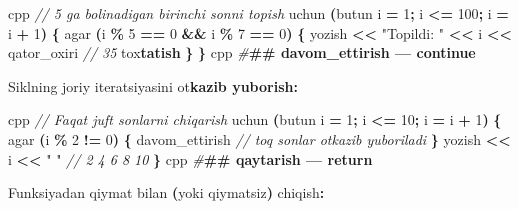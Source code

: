 \documentclass[a4paper,11pt,twoside,openright]{book}
\newenvironment{Shaded}{\begin{snugshade}}{\end{snugshade}}
\newcommand{\CharTok}[1]{\textcolor[rgb]{0.31,0.60,0.02}{#1}}
\newcommand{\CommentTok}[1]{\textcolor[rgb]{0.56,0.35,0.01}{\textit{#1}}}
\newcommand{\DecValTok}[1]{\textcolor[rgb]{0.00,0.00,0.81}{#1}}
\newcommand{\ErrorTok}[1]{\textcolor[rgb]{0.64,0.00,0.00}{\textbf{#1}}}
\newcommand{\NormalTok}[1]{#1}
\newcommand{\OperatorTok}[1]{\textcolor[rgb]{0.81,0.36,0.00}{\textbf{#1}}}
\newcommand{\PreprocessorTok}[1]{\textcolor[rgb]{0.56,0.35,0.01}{\textit{#1}}}
\newcommand{\StringTok}[1]{\textcolor[rgb]{0.31,0.60,0.02}{#1}}
\begin{document}
\begin{Shaded}
\begin{Highlighting}[]
\ErrorTok{\textasciigrave{}\textasciigrave{}\textasciigrave{}}\NormalTok{cpp}
\CommentTok{// 5 ga bo\textquotesingle{}linadigan birinchi sonni topish}
\NormalTok{uchun }\OperatorTok{(}\NormalTok{butun i }\OperatorTok{=} \DecValTok{1}\OperatorTok{;}\NormalTok{ i }\OperatorTok{\textless{}=} \DecValTok{100}\OperatorTok{;}\NormalTok{ i }\OperatorTok{=}\NormalTok{ i }\OperatorTok{+} \DecValTok{1}\OperatorTok{)} \OperatorTok{\{}
\NormalTok{    agar }\OperatorTok{(}\NormalTok{i }\OperatorTok{\%} \DecValTok{5} \OperatorTok{==} \DecValTok{0} \OperatorTok{\&\&}\NormalTok{ i }\OperatorTok{\%} \DecValTok{7} \OperatorTok{==} \DecValTok{0}\OperatorTok{)} \OperatorTok{\{}
\NormalTok{        yozish }\OperatorTok{\textless{}\textless{}} \StringTok{"Topildi: "} \OperatorTok{\textless{}\textless{}}\NormalTok{ i }\OperatorTok{\textless{}\textless{}}\NormalTok{ qator\_oxiri  }\CommentTok{// 35}
\NormalTok{        to}\CharTok{\textquotesingle{}x}\ErrorTok{tatish}
    \OperatorTok{\}}
\OperatorTok{\}}
\ErrorTok{\textasciigrave{}\textasciigrave{}\textasciigrave{}}\NormalTok{cpp}
\PreprocessorTok{\#}\ErrorTok{\#\# \textasciigrave{}davom\_ettirish\textasciigrave{} — \textasciigrave{}continue\textasciigrave{}}

\NormalTok{Siklning joriy iteratsiyasini o}\CharTok{\textquotesingle{}t}\ErrorTok{kazib yuborish:}

\ErrorTok{\textasciigrave{}\textasciigrave{}\textasciigrave{}}\NormalTok{cpp}
\CommentTok{// Faqat juft sonlarni chiqarish}
\NormalTok{uchun }\OperatorTok{(}\NormalTok{butun i }\OperatorTok{=} \DecValTok{1}\OperatorTok{;}\NormalTok{ i }\OperatorTok{\textless{}=} \DecValTok{10}\OperatorTok{;}\NormalTok{ i }\OperatorTok{=}\NormalTok{ i }\OperatorTok{+} \DecValTok{1}\OperatorTok{)} \OperatorTok{\{}
\NormalTok{    agar }\OperatorTok{(}\NormalTok{i }\OperatorTok{\%} \DecValTok{2} \OperatorTok{!=} \DecValTok{0}\OperatorTok{)} \OperatorTok{\{}
\NormalTok{        davom\_ettirish   }\CommentTok{// toq sonlar o\textquotesingle{}tkazib yuboriladi}
    \OperatorTok{\}}
\NormalTok{    yozish }\OperatorTok{\textless{}\textless{}}\NormalTok{ i }\OperatorTok{\textless{}\textless{}} \StringTok{" "}   \CommentTok{// 2 4 6 8 10}
\OperatorTok{\}}
\ErrorTok{\textasciigrave{}\textasciigrave{}\textasciigrave{}}\NormalTok{cpp}
\PreprocessorTok{\#}\ErrorTok{\#\# \textasciigrave{}qaytarish\textasciigrave{} — \textasciigrave{}return\textasciigrave{}}

\NormalTok{Funksiyadan qiymat bilan }\OperatorTok{(}\NormalTok{yoki qiymatsiz}\OperatorTok{)}\NormalTok{ chiqish}\OperatorTok{:}


\end{Highlighting}
\end{Shaded}
\end{document}
